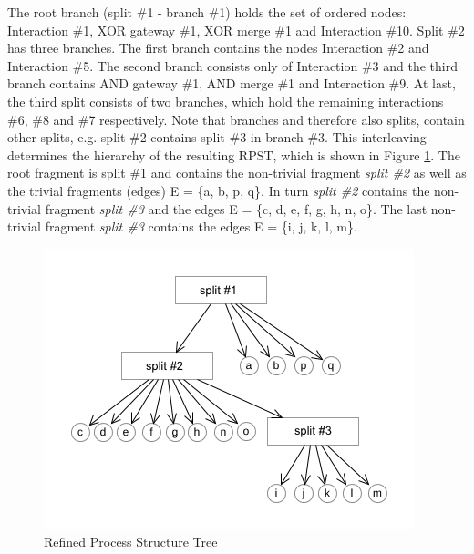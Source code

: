 The root branch (split \#1 - branch \#1) holds the set of ordered nodes: Interaction \#1, XOR gateway \#1, XOR merge \#1 and Interaction \#10. Split \#2 has three branches. The first branch contains the nodes Interaction \#2 and Interaction \#5. The second branch consists only of Interaction \#3 and the third branch contains AND gateway \#1, AND merge \#1 and Interaction \#9. At last, the third split consists of two branches, which hold the remaining interactions \#6, \#8 and \#7 respectively. Note that branches and therefore also splits, contain other splits, e.g. split \#2 contains split \#3 in branch \#3. This interleaving determines the hierarchy of the resulting RPST, which is shown in Figure \ref{fig:rpst_tree}. The root fragment is split \#1 and contains the non-trivial fragment \textit{split \#2} as well as the trivial fragments (edges) E = \{a, b, p, q\}. In turn \textit{split \#2} contains the non-trivial fragment \textit{split \#3} and the edges E = \{c, d, e, f, g, h, n, o\}. The last non-trivial fragment \textit{split \#3} contains the edges E = \{i, j, k, l, m\}.
\vspace{-0.25cm}
\begin{figure}[htb]
\centering
\includegraphics[width=0.6\linewidth]{src/images/graphTracking_rpst.png}
\caption{Refined Process Structure Tree}
\label{fig:rpst_tree}
\end{figure}

